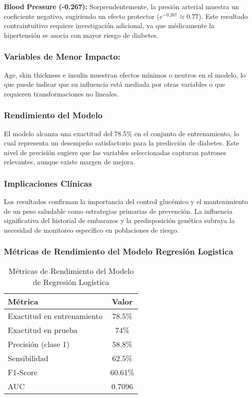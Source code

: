 \documentclass[12pt,a4paper]{article}
\begin{document}
\textbf{Blood Pressure (-0.267):} Sorprendentemente, la presión arterial muestra un coeficiente negativo, sugiriendo un efecto protector ($e^{-0.267} \approx 0.77$). Este resultado contraintuitivo requiere investigación adicional, ya que médicamente la hipertensión se asocia con mayor riesgo de diabetes.

\subsubsection{Variables de Menor Impacto:} Age, skin thickness e insulin muestran efectos mínimos o neutros en el modelo, lo que puede indicar que su influencia está mediada por otras variables o que requieren transformaciones no lineales.

\subsubsection{Rendimiento del Modelo}

El modelo alcanza una exactitud del 78.5\% en el conjunto de entrenamiento, lo cual representa un desempeño satisfactorio para la predicción de diabetes. Este nivel de precisión sugiere que las variables seleccionadas capturan patrones relevantes, aunque existe margen de mejora.

\subsubsection{Implicaciones Clínicas}

Los resultados confirman la importancia del control glucémico y el mantenimiento de un peso saludable como estrategias primarias de prevención. La influencia significativa del historial de embarazos y la predisposición genética subraya la necesidad de monitoreo específico en poblaciones de riesgo.

\subsubsection{Métricas de Rendimiento del Modelo Regresión Logistica}

\begin{table}[H]
\centering
\caption{Métricas de Rendimiento del Modelo de Regresión Logística}\label{tab:logistic_resultados}
\begin{tabular}{lc}
\toprule
\textbf{Métrica} & \textbf{Valor} \\
\midrule
Exactitud en entrenamiento & 78.5\% \\
Exactitud en prueba & 74\% \\
Precisión (clase 1) & 58.8\% \\
Sensibilidad & 62.5\% \\
F1-Score & 60.61\% \\
AUC & 0.7096 \\
\bottomrule
\end{tabular}
\end{table}
\end{document}
